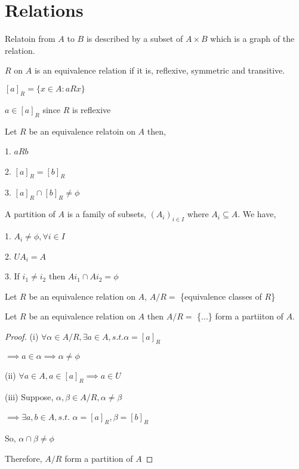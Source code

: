 \setcounter{chapter}{10}
\chapter{Relations}

\begin{theorem}
    Relatoin from $A$ to $B$ is described by a subset of $A \times  B$ which is a graph of the relation.
\end{theorem}

\begin{theorem}
    $R$ on $A$ is an equivalence relation if it is, reflexive, symmetric and transitive.
\end{theorem}

\begin{definition}
    $[a]_R = \{x \in A: aRx\}$ 
\end{definition}
\begin{property}
    $a \in [a]_R$  since $R$ is reflexive
\end{property}


\begin{theorem}
    Let $R$ be an equivalence relatoin on $A$ then, 

    1. $a Rb$

    2. $[a]_R = [b]_R$

    3.  $[a]_R \cap [b]_R \ne \phi$
\end{theorem}
\begin{definition}

A partition of $A$ is a family of subsets, $(A_i)_{i\in I}$ where $A_i \subseteq A$. We have,  

1. $A_i \ne \phi, \forall i \in I$

2. $UA_i = A$

3. If $i_1\ne i_2$ then $A{i_1} \cap A{i_2} = \phi$

\end{definition}

\begin{definition}
    Let $R$ be an equivalence relation on $A$, $A/R = $ \{equivalence classes of $R$\}
\end{definition}


\begin{theorem}
    Let $R$ be an equivalence relation on $A$ then $A/R = $ \{...\} form a partiiton of $A$.
\end{theorem}

\begin{proof}
    (i) $\forall \alpha \in A/R, \exists a \in A, s.t. \alpha = [a]_R$
    
    $\implies a \in \alpha \implies \alpha \ne \phi$

    (ii)  $\forall a \in A, a \in [a]_R \implies a \in U$

    (iii) Suppose,  $\alpha, \beta \in A/R, \alpha \ne \beta$ 

    $\implies \exists a,b \in A, s.t.$  $\alpha = [a]_R, \beta = [b]_R$
    
    So,  $\alpha \cap \beta \ne \phi$ 

    Therefore, $A / R$ form a partition of $A$
\end{proof}


